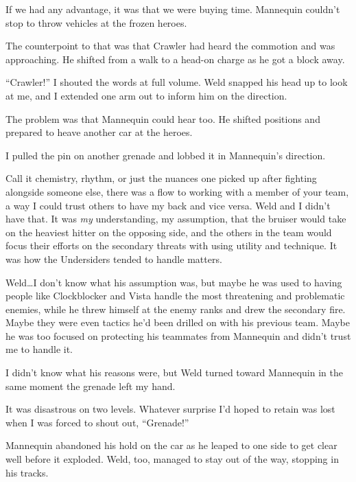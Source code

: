 If we had any advantage, it was that we were buying time.  Mannequin couldn't stop to throw vehicles at the frozen heroes.



The counterpoint to that was that Crawler had heard the commotion and was approaching.  He shifted from a walk to a head-on charge as he got a block away.



``Crawler!''  I shouted the words at full volume.  Weld snapped his head up to look at me, and I extended one arm out to inform him on the direction.



The problem was that Mannequin could hear too.  He shifted positions and prepared to heave another car at the heroes.



I pulled the pin on another grenade and lobbed it in Mannequin's direction.



Call it chemistry, rhythm, or just the nuances one picked up after fighting alongside someone else, there was a flow to working with a member of your team, a way I could trust others to have my back and vice versa.  Weld and I didn't have that.  It was \emph{my} understanding, my assumption, that the bruiser would take on the heaviest hitter on the opposing side, and the others in the team would focus their efforts on the secondary threats with using utility and technique.  It was how the Undersiders tended to handle matters.



Weld\ldots I don't know what his assumption was, but maybe he was used to having people like Clockblocker and Vista handle the most threatening and problematic enemies, while he threw himself at the enemy ranks and drew the secondary fire.  Maybe they were even tactics he'd been drilled on with his previous team.  Maybe he was too focused on protecting his teammates from Mannequin and didn't trust me to handle it.



I didn't know what his reasons were, but Weld turned toward Mannequin in the same moment the grenade left my hand.



It was disastrous on two levels.  Whatever surprise I'd hoped to retain was lost when I was forced to shout out, ``Grenade!''



Mannequin abandoned his hold on the car as he leaped to one side to get clear well before it exploded.  Weld, too, managed to stay out of the way, stopping in his tracks.



